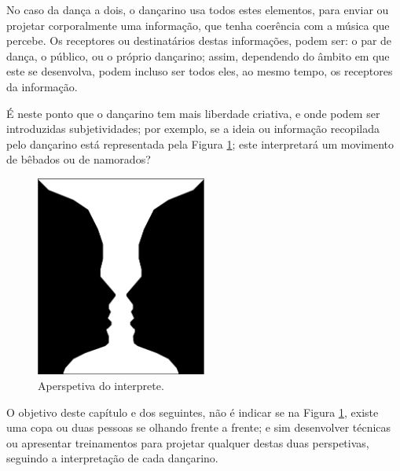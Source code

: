 No caso da dança a dois, o dançarino usa todos estes elementos, 
para enviar ou projetar corporalmente uma informação, que tenha coerência com a música que percebe.
Os receptores ou destinatários destas informações, podem ser: o par de dança,
o público, ou o próprio dançarino; 
assim, dependendo do âmbito em que este se desenvolva,
podem incluso ser todos eles, ao mesmo tempo, os receptores da informação.

É neste ponto que o dançarino tem mais liberdade criativa, 
e onde podem ser introduzidas subjetividades; por exemplo,
se a ideia ou informação recopilada pelo dançarino está representada pela Figura \ref{fig:LaCopaDeRubin};
este interpretará um  movimento de bêbados ou de namorados?
\begin{figure}[!h]
  \centering
    \includegraphics[width=0.5\textwidth]{chapters/cap-musicalidade/LaCopaDeRubin.eps}
\caption{Aperspetiva do interprete.}
\label{fig:LaCopaDeRubin}
\end{figure}

O objetivo deste capítulo e dos seguintes, não é indicar se na Figura \ref{fig:LaCopaDeRubin},
existe uma copa ou duas pessoas se olhando frente a frente; e sim desenvolver técnicas ou 
apresentar treinamentos para projetar qualquer destas duas perspetivas, seguindo a interpretação de cada dançarino.



